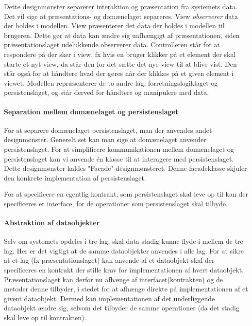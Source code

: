 Dette designmønster separerer interaktion og præsentation fra systemets data.
Det vil sige at præsentations- og domænelaget separeres. View \emph{observerer}
data der holdes i modellen. View præsenterer det data der holdes i modellen til
brugeren. Dette gør at data kan ændre sig uafhængigt af præsentationen, siden
præsentationslaget udelukkende observerer data.  Controlleren står for at
respondere på der sker i view, fx hvis en bruger klikker på et element der skal
starte et nyt view, da står den for det sætte det nye view til at blive vist.
Den står også for at håndtere hvad der gøres når der klikkes på et given element
i viewet.  Modellen repræsenterer de to andre lag, forretningslogiklaget og
persistenslaget, og står derved for håndtere og manipulere med data.

\paragraph{Separation mellem domænelaget og persistenslaget}

For at separere domænelaget persistenslaget, man der anvendes andet
designmønster. Generelt set kan man sige at domænelaget anvender
persistenslaget. For at simplificere kommunikationen mellem domænelaget og
persistenslaget kan vi anvende én klasse til at interagere med persistenslaget.
Dette designmønster kaldes "Facade"-designmønsteret. Denne facadeklasse skjuler
den konkrete implementation af persistenslaget.

For at specificere en egentlig kontrakt, som persistenslaget skal leve op til
kan der specificeres et interface, for de operationer som persistenslaget skal
tilbyde.

\paragraph{Abstraktion af dataobjekter}

Selv om systemets opdeles i tre lag, skal data stadig kunne flyde i mellem de
tre lag. Her er det vigtigt at de samme dataobjekter anvendes i alle lag. For at
sikre at et lag (fx præsentationslaget) kan anvende af et dataobjekt skal der
specificeres en kontrakt der stille krav for implementationen af hvert
dataobjekt. Præsentationslaget kan derfor nu afhænge af interfacet(kontrakten)
og de metoder denne tilbyder, i stedet for at afhænge direkte på
implementationen af et givent dataobjekt. Dermed kan implementationen af det
underliggende dataobjekt ændre sig, selvom det tilbyder de samme operationer (da
det stadig skal leve op til kontrakten).


